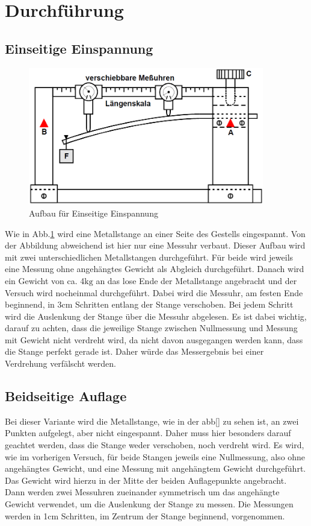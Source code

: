 \section{Durchführung}
\label{sec:Durchführung}

\subsection{Einseitige Einspannung}
\begin{figure}
    \centering
    \includegraphics[height=6cm]{data/bild_3}
    \caption{Aufbau für Einseitige Einspannung}
    \label{fig:aufbau1}
\end{figure}

Wie in Abb.\ref{fig:aufbau1} wird eine Metallstange an einer Seite des Gestells eingespannt. Von der Abbildung abweichend ist hier nur eine Messuhr
verbaut. Dieser Aufbau wird mit zwei unterschiedlichen Metallstangen durchgeführt. Für beide wird jeweils eine Messung ohne angehängtes
Gewicht als Abgleich durchgeführt. Danach wird ein Gewicht von ca. 4$\si{\kilo\gram}$ an das lose Ende der Metallstange angebracht und 
der Versuch wird nocheinmal durchgeführt. Dabei wird die Messuhr, am festen Ende beginnend, in 3$\si{\centi\meter}$ Schritten entlang der 
Stange verschoben. Bei jedem Schritt wird die Auslenkung der Stange über die Messuhr abgelesen. Es ist dabei wichtig, darauf zu achten,
dass die jeweilige Stange zwischen Nullmessung und Messung mit Gewicht nicht verdreht wird, da nicht davon ausgegangen werden kann, dass 
die Stange perfekt gerade ist. Daher würde das Messergebnis bei einer Verdrehung verfälscht werden. 

\subsection{Beidseitige Auflage}

Bei dieser Variante wird die Metallstange, wie in der abb[] zu sehen ist, an zwei Punkten aufgelegt, aber nicht eingespannt. Daher muss 
hier besonders darauf geachtet werden, dass die Stange weder verschoben, noch verdreht wird. Es wird, wie im vorherigen Versuch, für 
beide Stangen jeweils eine Nullmessung, also ohne angehängtes Gewicht, und eine Messung mit angehängtem Gewicht durchgeführt.
Das Gewicht wird hierzu in der Mitte der beiden Auflagepunkte angebracht. Dann werden zwei Messuhren zueinander symmetrisch um das 
angehängte Gewicht verwendet, um die Auslenkung der Stange zu messen. Die Messungen werden in 1$\si{\centi\meter}$ Schritten, im Zentrum 
der Stange beginnend, vorgenommen. 